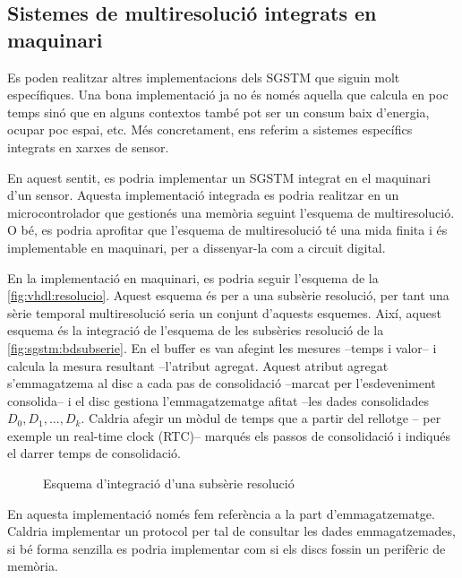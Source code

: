 \subsection{Sistemes de multiresolució  integrats en maquinari}

Es poden realitzar altres implementacions dels \gls{SGSTM} que siguin
molt específiques. Una bona implementació ja no és només aquella que
calcula en poc temps sinó que en alguns contextos també pot ser un
consum baix d'energia, ocupar poc espai, etc.  Més concretament,
ens referim a sistemes específics integrats en xarxes de sensor. 

En aquest sentit, es podria implementar un \gls{SGSTM} integrat en el
maquinari d'un sensor.  Aquesta implementació integrada es podria
realitzar en un microcontrolador que gestionés una memòria seguint
l'esquema de multiresolució. O bé, es podria aprofitar que l'esquema
de multiresolució té una mida finita i és implementable en maquinari,
per a dissenyar-la com a circuit digital.







En la implementació en maquinari, es podria seguir l'esquema de la
\autoref{fig:vhdl:resolucio}. Aquest esquema és per a una subsèrie
resolució, per tant una sèrie temporal multiresolució seria un conjunt
d'aquests esquemes. Així, aquest esquema és la integració de l'esquema
de les subsèries resolució de la \autoref{fig:sgstm:bdsubserie}.  En
el buffer es van afegint les mesures --temps i valor-- i calcula la
mesura resultant --l'atribut agregat. Aquest atribut agregat
s'emmagatzema al disc a cada pas de consolidació --marcat per
l'esdeveniment consolida-- i el disc gestiona l'emmagatzematge afitat
--les dades consolidades $D_0,D_1,\dotsc,D_k$. Caldria afegir un mòdul
de temps que a partir del rellotge -- per exemple un real-time clock
(RTC)-- marqués els passos de consolidació i indiqués el darrer temps
de consolidació. 





\begin{figure}[htp]
\centering

\caption{Esquema d'integració d'una subsèrie resolució}
\label{fig:vhdl:resolucio}
\end{figure}

En aquesta implementació només fem referència a la part
d'emmagatzematge.  Caldria implementar un protocol per tal de
consultar les dades emmagatzemades, si bé forma senzilla es podria
implementar com si els discs fossin un perifèric de memòria.  

